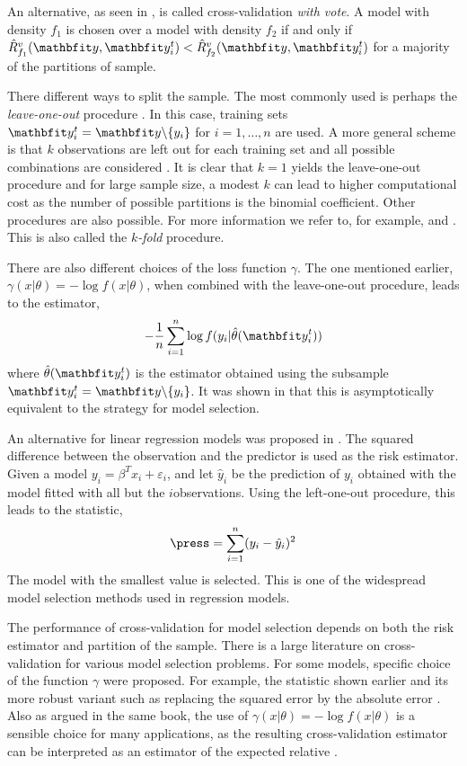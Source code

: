 An alternative, as seen in \cite{Yang:2007vx}, is called cross-validation
\emph{with vote}. A model with density $f_1$ is chosen over a model with
density $f_2$ if and only if $\hat{R}_{f_1}^v(\data,\data_i^t) <
\hat{R}_{f_2}^v(\data,\data_i^t)$ for a majority of the partitions of sample.

There different ways to split the sample. The most commonly used is perhaps
the \emph{leave-one-out} procedure \cite{Stone:1974vx,Geisser:1975vx}. In this
case, training sets $\data_i^t = \data\backslash\{y_i\}$ for $i = 1,\dots,n$
are used. A more general scheme is that $k$ observations are left out for each
training set and all possible combinations are considered \cite{Shao:1993vx}.
It is clear that $k=1$ yields the leave-one-out procedure and for large sample
size, a modest $k$ can lead to higher computational cost as the number of
possible partitions is the binomial coefficient. Other procedures are also
possible. For more information we refer to, for example, \cite{Stone:1978vx}
and \cite{Hjorth:1994vx}. This is also called the $k$\emph{-fold} procedure.

There are also different choices of the loss function $\gamma$. The one
mentioned earlier, $\gamma(x|\theta) = -\log f(x|\theta)$, when combined with
the leave-one-out procedure, leads to the estimator,
\begin{equation}
  -\frac{1}{n}\sum_{i=1}^n\log f(y_i|\hat\theta(\data_i^t))
\end{equation}
where $\hat\theta(\data_i^t)$ is the estimator obtained using the subsample
$\data_i^t = \data\backslash\{y_i\}$. It was shown in \cite{Stone:1978vx} that
this is asymptotically equivalent to the \aic strategy for model selection.

An alternative for linear regression models was proposed in
\cite{Allen:1974vx}. The squared difference between the observation and the
predictor is used as the risk estimator. Given a model $y_i = \beta^T x_i +
\varepsilon_i$, and let $\hat{y}_i$ be the prediction of $y_i$ obtained with
the model fitted with all but the $i$\xth observations. Using the left-one-out
procedure, this leads to the \press statistic,
\begin{equation}
  \press = \sum_{i=1}^n(y_i - \hat{y}_i)^2
\end{equation}
The model with the smallest \press value is selected. This is one of the
widespread model selection methods used in regression models.

The performance of cross-validation for model selection depends on both the
risk estimator and partition of the sample. There is a large literature on
cross-validation for various model selection problems. For some models,
specific choice of the function $\gamma$ were proposed. For example, the
\press statistic shown earlier and its more robust variant such as replacing
the squared error by the absolute error \cite[][sec.~2.9]{Claeskens:2008tq}.
Also as argued in the same book, the use of $\gamma(x|\theta) = -\log
f(x|\theta)$ is a sensible choice for many applications, as the resulting
cross-validation estimator can be interpreted as an estimator of the expected
relative \kld.


